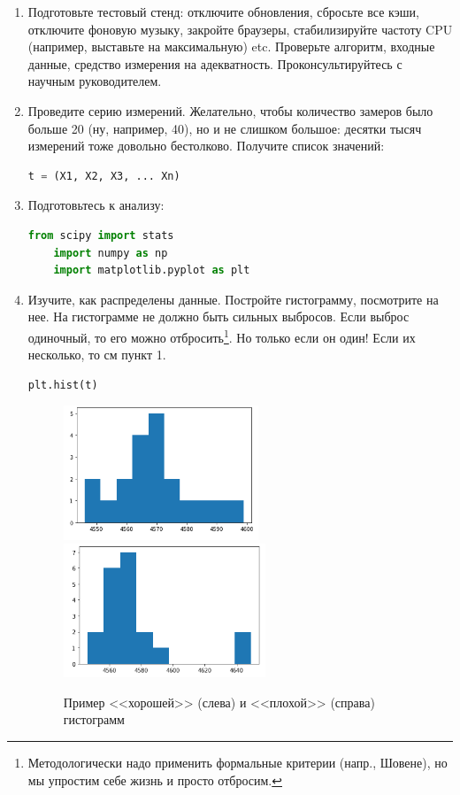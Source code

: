 \documentclass{article}
\begin{document}
\begin {enumerate}

\item Подготовьте тестовый стенд: отключите обновления, сбросьте все кэши, отключите фоновую музыку, закройте браузеры, стабилизируйте частоту CPU (например, выставьте на максимальную) etc. Проверьте алгоритм, входные данные, средство измерения на адекватность. Проконсультируйтесь с научным руководителем.

\item Проведите серию измерений. Желательно, чтобы количество замеров было больше 20 (ну, например, 40), но и не слишком большое: десятки тысяч измерений тоже довольно бестолково. Получите список значений:
\begin{lstlisting}[language=Python]
	t = (X1, X2, X3, ... Xn)
\end{lstlisting}

\item Подготовьтесь к анализу:
\begin{lstlisting}[language=Python]
	from scipy import stats
	import numpy as np
	import matplotlib.pyplot as plt
\end{lstlisting}

\item Изучите, как распределены данные. Постройте гистограмму, посмотрите на нее. На гистограмме не должно быть сильных выбросов. Если выброс одиночный, то его можно отбросить\footnote{Методологически надо применить формальные критерии (напр., Шовене), но мы упростим себе жизнь и просто отбросим.}. Но только если он один! Если их несколько, то см пункт 1.
\begin{lstlisting}[language=Python]
	plt.hist(t)
\end{lstlisting}

\begin{figure}[h]
\centering
\includegraphics[height=4cm]{hist.png}
\includegraphics[height=4cm]{hist2.png}
\caption{Пример <<хорошей>> (слева) и <<плохой>> (справа) гистограмм}
\end{figure}


\end{enumerate}
\end{document}
